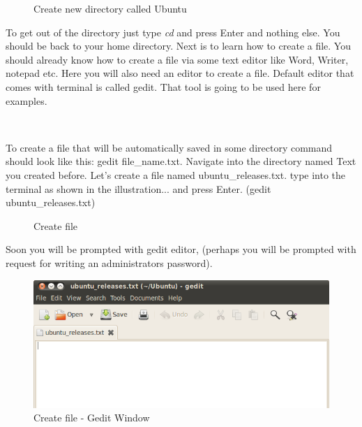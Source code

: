 \begin{figure}[h!]	
	\centering
	\caption{Create new directory called Ubuntu}	
	\label{fig:mkdir4}	
\end{figure}

\par \noindent To get out of the directory just type \textit{cd} and  press Enter and nothing else. You should be back to your home directory. Next is to learn how to create a file. You should already know how to create a file via some text editor like Word, Writer, notepad etc. Here you will also need an editor to create a file. Default editor that comes with terminal is called gedit. That tool is going to be used here for examples. \\

\par \noindent {} \\

\par \noindent To create a file that will be automatically saved in some directory command should look like this: gedit  file\_name.txt. Navigate into the directory named Text you created before. Let's create a file named ubuntu\_releases.txt. type into the terminal as shown in the illustration... and press Enter. (gedit  ubuntu\_releases.txt) \\

\begin{figure}[h!]	
	\centering
	\caption{Create file}	
	\label{fig:mkdir5}	
\end{figure}

\par \noindent Soon you will be prompted with gedit editor, (perhaps you will be prompted with request for writing an administrators password). \\

\begin{figure}[h!]	
	\centering
	\includegraphics[width=350pt]{./images/terminal/mkdir6.png}
	\caption{Create file - Gedit Window}	
	\label{fig:gedit}	
\end{figure}

